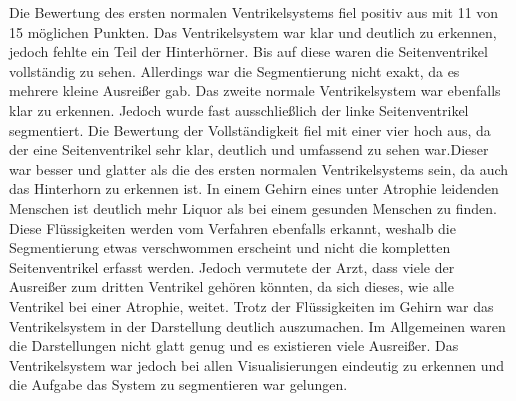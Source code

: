 Die Bewertung des ersten normalen Ventrikelsystems fiel positiv aus mit 11 von 15 möglichen Punkten. Das Ventrikelsystem war klar und deutlich zu erkennen, jedoch fehlte ein Teil der Hinterhörner. Bis auf diese waren die Seitenventrikel vollständig zu sehen. Allerdings war die Segmentierung nicht exakt, da es mehrere kleine Ausreißer gab.
\newline
Das zweite normale Ventrikelsystem war ebenfalls klar zu erkennen. Jedoch wurde fast ausschließlich der linke Seitenventrikel segmentiert. Die Bewertung der Vollständigkeit fiel mit einer vier hoch aus, da der eine Seitenventrikel sehr klar, deutlich und umfassend zu sehen war.Dieser war besser und glatter als die des ersten normalen Ventrikelsystems sein, da auch das Hinterhorn zu erkennen ist. 
\newline
In einem Gehirn eines unter Atrophie leidenden Menschen ist deutlich mehr Liquor als bei einem gesunden Menschen zu finden. Diese Flüssigkeiten werden vom Verfahren ebenfalls erkannt, weshalb die Segmentierung etwas verschwommen erscheint und nicht die kompletten Seitenventrikel erfasst werden. Jedoch vermutete der Arzt, dass viele der Ausreißer zum dritten Ventrikel gehören könnten, da sich dieses, wie alle Ventrikel bei einer Atrophie, weitet. Trotz der Flüssigkeiten im Gehirn war das Ventrikelsystem in der Darstellung deutlich auszumachen.
\newline
Im Allgemeinen waren die Darstellungen nicht glatt genug und es existieren viele Ausreißer. Das Ventrikelsystem war jedoch bei allen Visualisierungen eindeutig zu erkennen und die Aufgabe das System zu segmentieren war gelungen.


